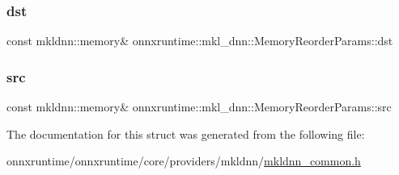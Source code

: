 \subsubsection{\texorpdfstring{dst}{dst}}
{\footnotesize\ttfamily const mkldnn\+::memory\& onnxruntime\+::mkl\+\_\+dnn\+::\+Memory\+Reorder\+Params\+::dst}

\mbox{\label{structonnxruntime_1_1mkl__dnn_1_1MemoryReorderParams_a7d431aa4291f0b9d112127290035a41a}} 
\subsubsection{\texorpdfstring{src}{src}}
{\footnotesize\ttfamily const mkldnn\+::memory\& onnxruntime\+::mkl\+\_\+dnn\+::\+Memory\+Reorder\+Params\+::src}



The documentation for this struct was generated from the following file\+:\begin{DoxyCompactItemize}
\item 
onnxruntime/onnxruntime/core/providers/mkldnn/\mbox{\hyperlink{mkldnn__common_8h}{mkldnn\+\_\+common.\+h}}\end{DoxyCompactItemize}
